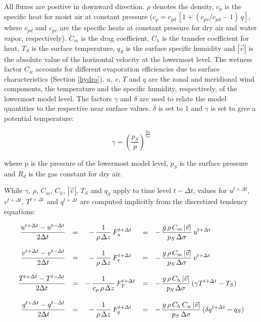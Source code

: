 All fluxes are positive
in downward  direction. $\rho$ denotes the density,
$c_p$ is the specific
heat for moist air at constant pressure ($c_p= c_{pd} \,
[1+(c_{pv}/c_{pd}-1)\, q]$, where
$c_{pd}$ and $c_{pv}$ are the specific heats at
constant pressure for dry air and water vapor,
respectively).  $C_m$ is the drag
coefficient, $C_h$ is the transfer coefficient for heat,
$T_S$ is
the surface temperature, $q_S$ is the surface specific
humidity
and $|\vec{v}|$ is the absolute value of the horizontal
velocity at the lowermost level. The wetness factor
$C_w$
accounts
for different evaporation efficiencies due to surface
characteristics (Section \ref{hydro}).  $u$, $v$,
$T$ and $q$ are the zonal and meridional wind
components, the
temperature and the specific humidity, respectively,
of the lowermost model level. The factors $\gamma$
and ${\delta}$ are used to relate  the model quantities
to
the respective near surface
values. $\delta$ is set to 1 and  $\gamma$ is set to  
give a potential temperature: 


\begin{equation}\label{gamma}
\gamma = \left(\frac{p_S}{p}\right)^{\frac{R_d}{c_{pd}}}
\end{equation}

 where p is the pressure of the lowermost
model level, $p_S$ is the surface pressure and $R_d$
is the gas constant for dry air.  

While $\gamma$, $\rho$,
$C_m$, $C_h$, 
$|\vec{v}|$,
$T_S$ and  $q_S$ apply to time level $t - \Delta t$,
values
for $u^{t+ \Delta t}$, $v^{t+ \Delta t}$, $T^{t+ \Delta
t}$
and $q^{t+ \Delta t}$ are computed implicitly
from the discretized tendency equations:

\begin{equation}
\begin{array}{rcccl}
\displaystyle \frac{u^{t+\Delta t}-u^{t-\Delta t}}{2 \Delta
t} & = & \displaystyle -
\,
\frac{1}{\rho \, \Delta z}\, F_u^{t+\Delta t} & = & \displaystyle
- \,
\frac
{g \, \rho \, C_m  \, |\vec{v}|}{p_S \, \Delta \sigma} \,
u^{t +
\Delta t}  \\  
&&&& \\
\displaystyle \frac{v^{t+\Delta t}-v^{t-\Delta t}}{2 \Delta t} & =
&
\displaystyle  
- \,
\frac{1}{\rho \, \Delta z}\, F_v^{t+\Delta t} & = & \displaystyle
- \,
\frac
{g \, \rho \, C_m \, |\vec{v}|}{p_S \, \Delta \sigma} \,
v^{t +
\Delta t} \\
&&&& \\
\displaystyle \frac{T^{t+\Delta t}-T^{t-\Delta t}}{2 \Delta t}  &
= &
\displaystyle 
-\,
\frac{1}{c_p \, \rho \, \Delta z} \, F_T^{t+\Delta t} &
= & \displaystyle -
\,
\frac{g \, \rho \, C_h  \, |\vec{v}|}  {p_S \, \Delta
\sigma} \,
(\gamma T^{t + \Delta t} - T_S)  \\
&&&& \\
\displaystyle \frac{q^{t+\Delta t}-q^{t-\Delta t}}{2 \Delta t} & =
&
\displaystyle -
\,
\frac{1}{\rho \, \Delta z} \, F_q^{t+\Delta t}& = & \displaystyle 
- \, 
\frac{g \, \rho \, C_h \, C_w \, |\vec{v}|}  {p_S \, \Delta
\sigma} \,
(\delta q^{t + \Delta t} - q_S)
\end{array}
\end{equation}

